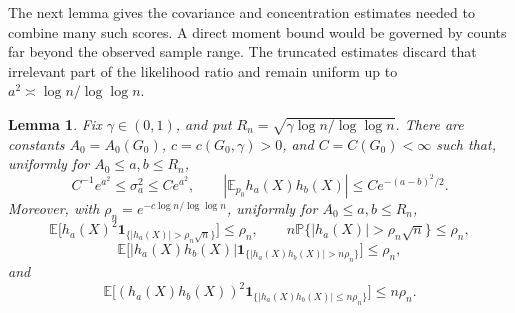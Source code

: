 \documentclass[11pt]{article}
\newtheorem{lemma}[theorem]{Lemma}
\theoremstyle{definition}
\numberwithin{equation}{section}
\newcommand{\E}{\mathbb{E}}
\begin{document}
The next lemma gives the covariance and concentration estimates needed to
combine many such scores. A direct moment bound would be governed by counts
far beyond the observed sample range. The truncated estimates discard that
irrelevant part of the likelihood ratio and remain uniform up to
\(a^2\asymp\log n/\log\log n\).

\begin{lemma}
\label{lem:poisson-finite-score-truncation}
Fix \(\gamma\in(0,1)\), and put \(R_n=\sqrt{\gamma\log n/\log\log n}\). There are constants \(A_0=A_0(G_0)\), \(c=c(G_0,\gamma)>0\), and \(C=C(G_0)<\infty\) such that, uniformly for \(A_0\le a,b\le R_n\),
\[
    C^{-1}e^{a^2}\le \sigma_a^2\le C e^{a^2},
    \qquad
    |\E_{p_0}h_a(X)h_b(X)|\le C e^{-(a-b)^2/2}.
\]
Moreover, with \(\rho_n=e^{-c\log n/\log\log n}\), uniformly for \(A_0\le a,b\le R_n\),
\[
    \E\bigl[h_a(X)^2\mathbf 1_{\{|h_a(X)|>\rho_n\sqrt n\}}\bigr]
    \le \rho_n,
    \qquad
    n\mathbb P\{|h_a(X)|>\rho_n\sqrt n\}
    \le \rho_n,
\]
\[
    \E\bigl[
        |h_a(X)h_b(X)|
        \mathbf 1_{\{|h_a(X)h_b(X)|>n\rho_n\}}
    \bigr]
    \le \rho_n,
\]
and
\[
    \E\bigl[
        (h_a(X)h_b(X))^2
        \mathbf 1_{\{|h_a(X)h_b(X)|\le n\rho_n\}}
    \bigr]
    \le n\rho_n.
\]
\end{lemma}
\end{document}

